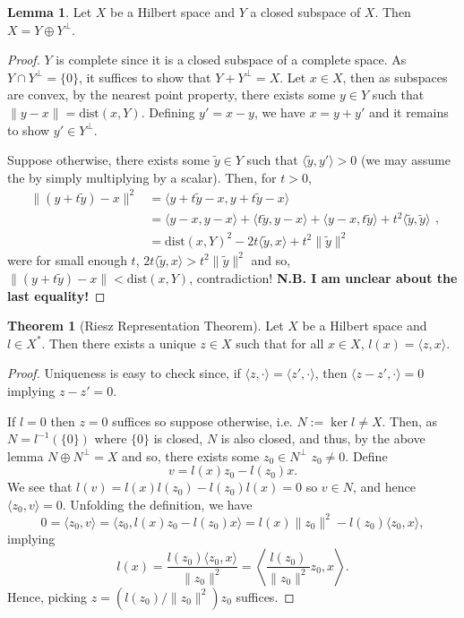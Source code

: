 \documentclass[]{article}
\theoremstyle{definition}
\newtheorem{theorem}{Theorem}
\theoremstyle{definition}
\newtheorem{lemma}{Lemma}[section]
\begin{document}
\begin{lemma}
  Let \(X\) be a Hilbert space and \(Y\) a closed subspace of \(X\). Then 
  \(X = Y \oplus Y^{\perp}\).
\end{lemma}
\begin{proof}
  \(Y\) is complete since it is a closed subspace of a complete space. 
  As \(Y \cap Y^{\perp} = \{0\}\), it suffices to show that \(Y + Y^{\perp} = X\). 
  Let \(x \in X\), then as subspaces are convex, by the nearest point property, 
  there exists some \(y \in Y\) such that \(\|y - x\| = \text{dist}(x, Y)\).
  Defining \(y' = x - y\), we have \(x = y + y'\) and it remains to show 
  \(y' \in Y^\perp\). 
  
  Suppose otherwise, there exists some \(\tilde y \in Y\) 
  such that \(\langle \tilde y, y'\rangle > 0\) (we may assume the by simply 
  multiplying by a scalar). Then, for \(t > 0\), 
  \[\begin{split}
    \|(y + t \tilde y) - x\|^2 
    & = \langle y + t\tilde y - x, y + t\tilde y - x \rangle\\
    & = \langle y - x, y - x \rangle + \langle t \tilde y, y - x \rangle + 
        \langle y - x, t \tilde y \rangle + t^2  \langle \tilde y, 
        \tilde y \rangle\\
    & = \text{dist}(x, Y)^2 - 2t\langle \tilde y, x\rangle + t^2 \|\tilde y\|^2
  \end{split},\]
  were for small enough \(t\), \(2t\langle \tilde y, x\rangle > t^2 \|\tilde y\|^2\) 
  and so, \(\|(y + t \tilde y) - x\| < \text{dist}(x, Y)\), contradiction! 
  \textbf{N.B. I am unclear about the last equality!}
\end{proof}

\begin{theorem}[Riesz Representation Theorem]
  Let \(X\) be a Hilbert space and \(l \in X^*\). Then there exists a unique 
  \(z \in X\) such that for all \(x \in X\), \(l(x) = \langle z, x \rangle\).
\end{theorem}
\begin{proof}
  Uniqueness is easy to check since, if 
  \(\langle z, \cdot\rangle = \langle z', \cdot\rangle\), then 
  \(\langle z - z', \cdot\rangle = 0\) implying \(z - z' = 0\). 

  If \(l = 0\) then \(z = 0\) suffices so suppose otherwise, i.e. 
  \(N := \ker l \neq X\). Then, as \(N = l^{-1}(\{0\})\) where 
  \(\{0\}\) is closed, \(N\) is also closed, and thus, by the above lemma 
  \(N \oplus N^{\perp} = X\) and so, there exists some \(z_0 \in N^\perp\) 
  \(z_0 \neq 0\). Define 
  \[v = l(x)z_0 - l(z_0) x.\]
  We see that \(l(v) = l(x)l(z_0) - l(z_0)l(x) = 0\) so \(v \in N\), and 
  hence \(\langle z_0, v \rangle = 0\). Unfolding the definition, we have 
  \[0 = \langle z_0, v \rangle = \langle z_0, l(x)z_0 - l(z_0) x \rangle 
      = l(x)\|z_0\|^2 - l(z_0)\langle z_0, x \rangle,\]
  implying 
  \[l(x) = \frac{l(z_0)\langle z_0, x \rangle}{\|z_0\|^2} = 
    \left\langle \frac{l(z_0)}{\|z_0\|^2}z_0, x \right\rangle.\]
  Hence, picking \(z = (l(z_0) /\|z_0\|^2)z_0\) suffices.
\end{proof}
\end{document}
